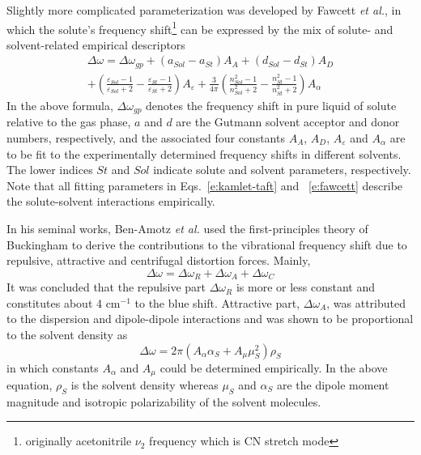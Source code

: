 \documentclass[a4paper,titlepage,twoside,fleqn,12pt]{book}
\begin{document}
\begin{refsection}
Slightly more complicated parameterization was developed 
by Fawcett \emph{et al.}\citep{Reimers.Hall.JACS.1999,Fawcett.Liu.Kessler.JPC.1993,Fawcett.Kloss.JCP.1996},
in which the solute's frequency shift\footnote{originally acetonitrile $\nu_2$ frequency
which is CN stretch mode} can be expressed by the mix of solute- and
solvent-related empirical descriptors
%
\begin{multline} \label{e:fawcett}
\Delta \omega = \Delta \omega_{gp} + 
\left( a_{Sol} - a_{St} \right) A_A +
\left( d_{Sol} - d_{St} \right) A_D \\ + 
\left( \frac{\varepsilon_{Sol}-1}{\varepsilon_{Sol}+2} - \frac{\varepsilon_{St}-1}{\varepsilon_{St}+2} \right) A_\varepsilon +
\frac{3}{4\pi}
\left( \frac{n^2_{Sol}-1}{n^2_{Sol}+2} - \frac{n^2_{St}-1}{n^2_{St}+2} \right) A_\alpha
\end{multline}
%
In the above formula, $\Delta \omega_{gp}$ denotes the frequency shift in pure liquid of solute
relative to the gas phase,
$a$ and $d$ are the Gutmann solvent acceptor and donor numbers\citep{Gutmann.Resch.Linert.CoordChemRev.1982}, 
respectively,
and the associated four constants $A_A$, $A_D$, $A_\varepsilon$ and $A_\alpha$ 
are to be fit to the experimentally determined frequency shifts in different solvents.
The lower indices $St$ and $Sol$ indicate solute and solvent parameters, respectively. 
Note that all fitting parameters in Eqs.~\eqref{e:kamlet-taft} and ~\eqref{e:fawcett} 
describe the solute\hyp{}solvent interactions empirically.

In his seminal works, Ben\hyp{}Amotz \emph{et al.}\citep{Ben-Amotz.Lee.Cho.List.JCP.1992} 
used the first\hyp{}principles theory of Buckingham\citep{Buckingham.ProcRSocLondonA.1958,
Buckingham.ProcRSocLondonA.1960,Buckingham.TransFaradaySoc.1960}
to derive the contributions to the vibrational frequency shift due to
repulsive, attractive and centrifugal distortion forces. Mainly,
%
\begin{equation} \label{e:ben-amotz}
 \Delta \omega = \Delta \omega_R + \Delta \omega_A + \Delta \omega_C
\end{equation}
%
It was concluded that the repulsive part $\Delta \omega_R$ is more or less constant
and constitutes about 4 cm$^{-1}$ to the blue shift. Attractive part, $\Delta \omega_A$,
was attributed to the dispersion and dipole-dipole interactions
and was shown to be proportional to the solvent density as
%
\begin{equation} \label{e:ben-amotz-ro}
 \Delta \omega = 2\pi\left( A_\alpha \alpha_S + A_\mu \mu_S^2 \right) \rho_S
\end{equation}
%
in which constants $A_\alpha$ and $A_\mu$ could be determined empirically. 
In the above equation, $\rho_S$ is the solvent density whereas $\mu_S$ and $\alpha_S$ are the
dipole moment magnitude and isotropic polarizability of the solvent molecules.


\end{refsection}
\end{document}
